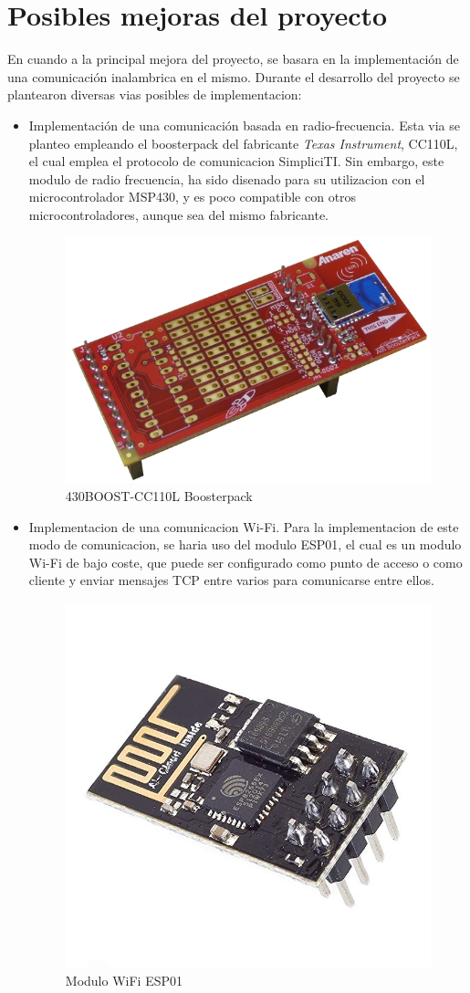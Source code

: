 \documentclass[a4paper,twoside]{article}
\begin{document}
\section{Posibles mejoras del proyecto}
En cuando a la principal mejora del proyecto, se basara en la implementación de una comunicación inalambrica en el mismo. Durante el desarrollo del proyecto se plantearon diversas vias posibles de implementacion:
\begin{itemize}
\item Implementación de una comunicación basada en radio-frecuencia. Esta via se planteo empleando el boosterpack del fabricante \textit{Texas Instrument}, CC110L, el cual emplea el protocolo de comunicacion SimpliciTI. Sin embargo, este modulo de radio frecuencia, ha sido disenado para su utilizacion con el microcontrolador MSP430, y es poco compatible con otros microcontroladores, aunque sea del mismo fabricante. \\
\begin{figure}[h!]
 \centering
 \includegraphics[width=.3\textwidth]{../images/rf_bp}
 \caption{430BOOST-CC110L Boosterpack}
\end{figure}

\item Implementacion de una comunicacion Wi-Fi. Para la implementacion de este modo de comunicacion, se haria uso del modulo ESP01, el cual es un modulo Wi-Fi de bajo coste, que puede ser configurado como punto de acceso o como cliente y enviar mensajes TCP entre varios para comunicarse entre ellos. \\
\begin{figure}[h!]
 \centering
 \includegraphics[width=.2\textwidth]{../images/esp8266}
 \caption{Modulo WiFi ESP01}
\end{figure}
\end{itemize}
\end{document}
